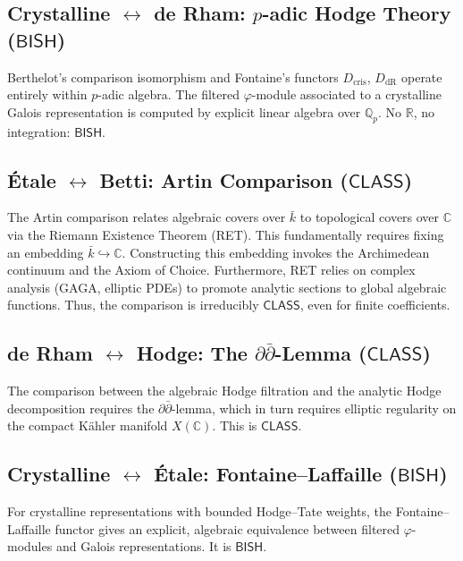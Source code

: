 \documentclass[11pt,a4paper]{article}
\theoremstyle{plain}
\theoremstyle{definition}
\newcommand{\BISH}{\textsf{BISH}}
\newcommand{\CLASS}{\textsf{CLASS}}
\newcommand{\Q}{\mathbb{Q}}
\newcommand{\R}{\mathbb{R}}
\newcommand{\C}{\mathbb{C}}
\begin{document}
\subsection{Crystalline $\leftrightarrow$ de Rham: $p$-adic Hodge Theory ($\BISH$)}

Berthelot's comparison isomorphism and Fontaine's functors $D_{\mathrm{cris}}$, $D_{\mathrm{dR}}$ operate entirely within $p$-adic algebra. The filtered $\varphi$-module associated to a crystalline Galois representation is computed by explicit linear algebra over $\Q_p$. No $\R$, no integration: $\BISH$.

\subsection{\'Etale $\leftrightarrow$ Betti: Artin Comparison ($\CLASS$)}

The Artin comparison relates algebraic covers over $\bar{k}$ to topological covers over $\C$ via the Riemann Existence Theorem (RET). This fundamentally requires fixing an embedding $\bar{k} \hookrightarrow \C$. Constructing this embedding invokes the Archimedean continuum and the Axiom of Choice. Furthermore, RET relies on complex analysis (GAGA, elliptic PDEs) to promote analytic sections to global algebraic functions. Thus, the comparison is irreducibly $\CLASS$, even for finite coefficients.

\subsection{de Rham $\leftrightarrow$ Hodge: The $\partial\bar\partial$-Lemma ($\CLASS$)}

The comparison between the algebraic Hodge filtration and the analytic Hodge decomposition requires the $\partial\bar\partial$-lemma, which in turn requires elliptic regularity on the compact K\"ahler manifold $X(\C)$. This is $\CLASS$.

\subsection{Crystalline $\leftrightarrow$ \'Etale: Fontaine--Laffaille ($\BISH$)}

For crystalline representations with bounded Hodge--Tate weights, the Fontaine--Laffaille functor gives an explicit, algebraic equivalence between filtered $\varphi$-modules and Galois representations. It is $\BISH$.
\end{document}
